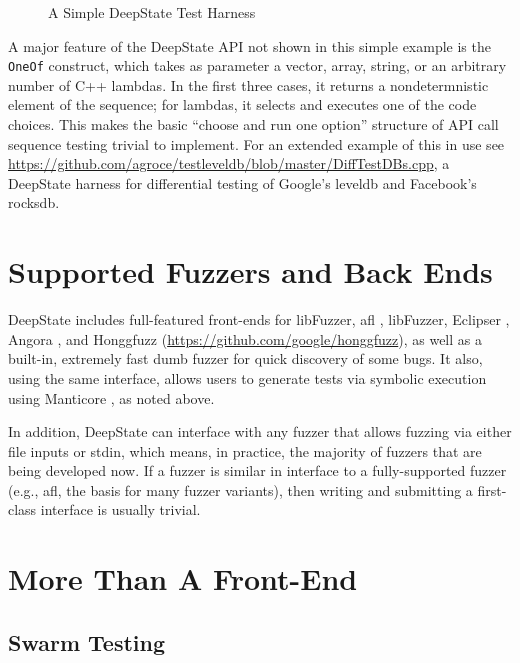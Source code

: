 \documentclass[sigconf]{acmart}
\begin{document}
\begin{figure}
{\scriptsize
\begin{code}

\end{code}
}
  \caption{A Simple DeepState Test Harness}
  \label{fig:example}
  \end{figure}


A major feature of the DeepState API not shown in this simple example is the {\tt OneOf} construct, which takes as parameter a vector, array, string, or an arbitrary number of C++ lambdas.  In the first three cases, it returns a nondetermnistic element of the sequence; for lambdas, it selects and executes one of the code choices.  This makes the basic ``choose and run one option'' structure of API call sequence testing trivial to implement.  For an extended example of this in use see \url{https://github.com/agroce/testleveldb/blob/master/DiffTestDBs.cpp}, a DeepState harness for differential testing of Google's leveldb and Facebook's rocksdb.
  
\section{Supported Fuzzers and Back Ends}

DeepState includes full-featured front-ends for libFuzzer, afl \cite{aflfuzz}, libFuzzer, Eclipser \cite{choi:icse:2019}, Angora \cite{chen2018angora}, and Honggfuzz (\url{https://github.com/google/honggfuzz}), as well as a built-in, extremely fast dumb fuzzer for quick discovery of some bugs.  It also, using the same interface, allows users to generate tests via symbolic execution using Manticore \cite{mossberg2019manticore}, as noted above.

In addition, DeepState can interface with any fuzzer that allows fuzzing via either file inputs or stdin, which means, in practice, the majority of fuzzers that are being developed now.  If a fuzzer is similar in interface to a fully-supported fuzzer (e.g., afl, the basis for many fuzzer variants), then writing and submitting a first-class interface is usually trivial.

\section{More Than A Front-End}

\subsection{Swarm Testing}
\end{document}
